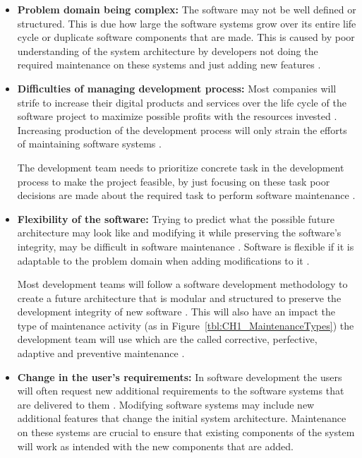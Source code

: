 \begin{itemize}
	\item \textbf{Problem domain being complex:} The software may not be well defined or structured. This is due how large the software systems grow over its entire life cycle or duplicate software components that are made. This is caused by poor understanding of the system architecture by developers not doing the required maintenance on these systems and just adding new features \cite{Galster2019, Booch1986}.
	\item \textbf{Difficulties of managing development process:} Most companies will strife to increase their digital products and services over the life cycle of the software project to maximize possible profits with the resources invested \cite{Niu2018}. Increasing production of the development process will only strain the efforts of maintaining software systems \cite{Sneed2004}.\par The development team needs to prioritize concrete task in the development process to make the project feasible, by just focusing on these task poor decisions are made about the required task to perform software maintenance \cite{Galster2019, Ogheneovo2014, Lenarduzzi2017}. 
	\item \textbf{Flexibility of the software:} Trying to predict what the possible future architecture may look like and modifying it while preserving the software's integrity, may be difficult in software maintenance \cite{Garlan1999}. Software is flexible if it is adaptable to the problem domain when adding modifications to it \cite{Ogheneovo2014}.\par Most development teams will follow a software development methodology to create a future architecture that is modular and structured to preserve the development integrity of new software \cite{Vijayasarathy2016, Rehman2018}. This will also have an impact the type of maintenance activity (as in Figure~\ref{tbl:CH1_MaintenanceTypes}) the development team will use which are the called corrective, perfective, adaptive and preventive maintenance \cite{FrancisThamburaj2017, Hasan2012, Stojanov2017, Snipes2018}.
	\item \textbf{Change in the user's requirements:} In software development the users will often request new additional requirements to the software systems that are delivered to them \cite{Ogheneovo2014}. Modifying software systems may include new additional features that change the initial system architecture. Maintenance on these systems are crucial to ensure that existing components of the system will work as intended with the new components that are added.
\end{itemize}


